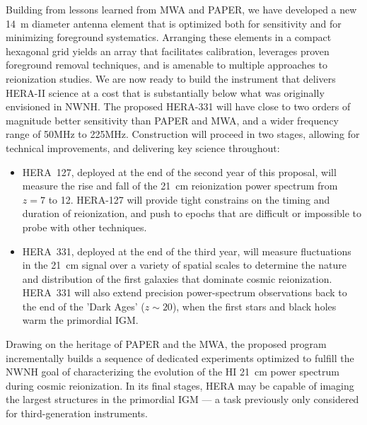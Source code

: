 \documentclass[preprint]{aastex}
\begin{document}
Building from lessons learned from MWA and PAPER, we have developed a new 14~m diameter antenna element 
that is optimized both for sensitivity and for minimizing foreground systematics.  
Arranging these elements in a compact hexagonal grid yields an array that
facilitates calibration, leverages proven foreground removal techniques, and is amenable 
to multiple approaches to reionization studies. We are now ready to build the instrument
that delivers HERA-II science at a cost that is substantially below what was originally envisioned in NWNH.
The proposed HERA-331 will have close to two orders of magnitude better
sensitivity than PAPER and MWA, and a wider frequency range of 50MHz to 225MHz. 
Construction will proceed in two stages, allowing for technical improvements, and delivering key science
throughout: 

\begin{itemize}[noitemsep,nolistsep]

\item HERA~127, deployed at the end of the second year of this proposal, will measure the rise and fall of the 
21~cm reionization power spectrum from $z = 7$ to 12. HERA-127 will provide tight constrains on 
the timing and duration of reionization, and push to epochs that are difficult or impossible to 
probe with other techniques.

\item HERA~331, deployed at the end of the third year, will measure fluctuations in the 21~cm
signal over a variety of spatial
scales to determine the nature and distribution of the first galaxies
that dominate cosmic reionization. HERA~331 will also extend precision
power-spectrum observations back to the end of the 'Dark Ages' ($z \sim 20$), 
when the first stars and black holes warm the primordial IGM. 

\end{itemize}

Drawing on the heritage of PAPER and the MWA, the proposed program incrementally builds a 
sequence of dedicated experiments
optimized to fulfill the NWNH goal of characterizing the evolution of
the HI 21~cm power spectrum during cosmic reionization. In
its final stages, HERA may be capable of imaging the largest structures in the primordial
IGM --- a task previously only considered for third-generation
instruments. 
\end{document}
